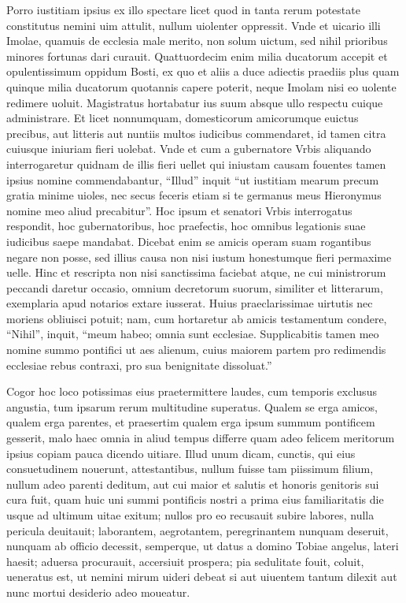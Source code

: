 \documentclass[a5paper,twoside]{article}
\begin{document}
Porro iustitiam ipsius ex illo spectare licet quod in tanta rerum potestate constitutus nemini uim attulit, nullum uiolenter oppressit. Vnde et uicario illi Imolae, quamuis de ecclesia male merito, non solum uictum, sed nihil prioribus minores fortunas dari curauit. Quattuordecim enim milia ducatorum accepit et opulentissimum oppidum Bosti, ex quo et aliis a duce adiectis praediis plus quam quinque milia ducatorum quotannis capere poterit, neque Imolam nisi eo uolente redimere uoluit. Magistratus hortabatur ius suum absque ullo respectu cuique administrare.  Et licet nonnumquam, domesticorum amicorumque euictus precibus, aut litteris aut nuntiis multos iudicibus commendaret, id tamen citra cuiusque iniuriam fieri uolebat. Vnde et cum a gubernatore Vrbis aliquando interrogaretur quidnam de illis fieri uellet qui iniustam causam fouentes tamen ipsius nomine commendabantur, ``Illud'' inquit ``ut iustitiam mearum precum gratia minime uioles, nec secus feceris etiam si te germanus meus Hieronymus nomine meo aliud precabitur''.  Hoc ipsum et senatori Vrbis interrogatus respondit, hoc gubernatoribus, hoc praefectis, hoc omnibus legationis suae iudicibus saepe mandabat.  Dicebat enim se amicis operam suam rogantibus negare non posse, sed illius causa non nisi iustum honestumque fieri permaxime uelle.   Hinc et rescripta non nisi sanctissima faciebat atque, ne cui ministrorum peccandi daretur occasio, omnium decretorum suorum, similiter et litterarum, exemplaria apud notarios extare iusserat.  Huius praeclarissimae uirtutis nec moriens obliuisci potuit; nam, cum hortaretur ab amicis testamentum condere, ``Nihil'', inquit, ``meum habeo; omnia sunt ecclesiae. Supplicabitis tamen meo nomine summo pontifici ut aes alienum, cuius maiorem partem pro redimendis ecclesiae rebus contraxi, pro sua benignitate dissoluat.''

Cogor hoc loco potissimas eius praetermittere laudes, cum temporis exclusus angustia, tum ipsarum rerum multitudine superatus.  Qualem se erga amicos, qualem erga parentes, et praesertim qualem erga ipsum summum pontificem gesserit, malo haec omnia in aliud tempus differre quam adeo felicem meritorum ipsius copiam pauca dicendo uitiare.   Illud unum dicam, cunctis, qui eius consuetudinem nouerunt, attestantibus, nullum fuisse tam piissimum filium, nullum adeo parenti deditum, aut cui maior et salutis et honoris genitoris sui cura fuit, quam huic uni summi pontificis nostri a prima eius familiaritatis die usque ad ultimum uitae exitum; nullos pro eo recusauit subire labores, nulla pericula deuitauit; laborantem, aegrotantem, peregrinantem nunquam deseruit, nunquam ab officio decessit, semperque, ut datus a domino Tobiae angelus, lateri haesit; aduersa procurauit, accersiuit prospera; pia sedulitate fouit, coluit, ueneratus est, ut nemini mirum uideri debeat si aut uiuentem tantum dilexit aut nunc mortui desiderio adeo moueatur.
\end{document}
